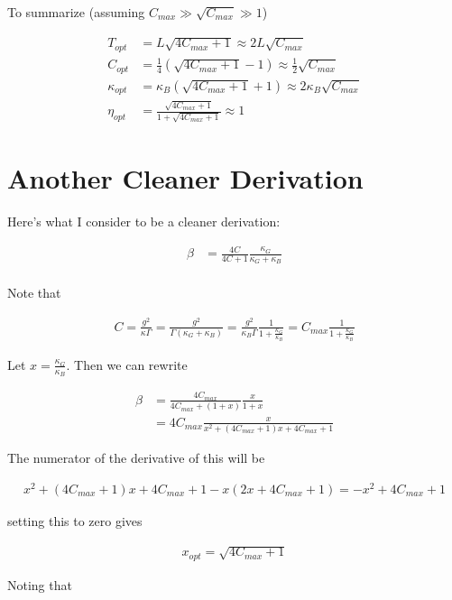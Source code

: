 \documentclass[12pt]{article}
\begin{document}
To summarize (assuming $C_{max} \gg \sqrt{C_{max}} \gg 1$)

\begin{align}
T_{opt} &= L \sqrt{4C_{max}+1} \approx 2L \sqrt{C_{max}}\\
C_{opt} &= \frac{1}{4}\left(\sqrt{4C_{max}+1}-1\right) \approx \frac{1}{2}\sqrt{C_{max}}\\
\kappa_{opt} &= \kappa_B\left(\sqrt{4C_{max}+1}+1\right) \approx 2\kappa_B\sqrt{C_{max}}\\
\eta_{opt} &= \frac{\sqrt{4C_{max}+1}}{1+\sqrt{4C_{max}+1}} \approx 1
\end{align}

\section{Another Cleaner Derivation}

Here's what I consider to be a cleaner derivation:

\begin{align}
\beta &= \frac{4C}{4C+1} \frac{\kappa_G}{\kappa_G+\kappa_B}\\
\end{align}

Note that

\begin{align}
C = \frac{g^2}{\kappa \Gamma} = \frac{g^2}{\Gamma (\kappa_G + \kappa_B)} = \frac{g^2}{\kappa_B \Gamma} \frac{1}{1+ \frac{\kappa_G}{\kappa_B}} = C_{max} \frac{1}{1+\frac{\kappa_G}{\kappa_B}}
\end{align}

Let $x = \frac{\kappa_G}{\kappa_B}$. Then we can rewrite

\begin{align}
\beta &= \frac{4C_{max}}{4C_{max} + (1+x)} \frac{x}{1+x}\\
&= 4C_{max} \frac{x}{x^2 + (4C_{max}+1)x + 4C_{max}+1}
\end{align}

The numerator of the derivative of this will be

\begin{align}
x^2 + (4C_{max}+1)x + 4C_{max}+1 - x(2x + 4C_{max}+1) = -x^2 + 4C_{max}+1
\end{align}

setting this to zero gives

\begin{align}
x_{opt} = \sqrt{4C_{max}+1}
\end{align}

Noting that
\end{document}
